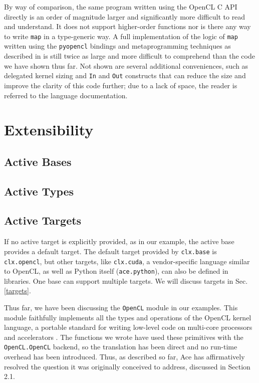 \documentclass[9pt,preprint]{sigplanconf}
\begin{document}
By way of comparison, the same program written using the OpenCL C API directly is an order of magnitude larger and significantly more difficult to read and understand. It does not support higher-order functions nor is there any way to write \verb|map| in a type-generic way. A full implementation of the logic of \verb|map| written using the \verb|pyopencl| bindings and metaprogramming techniques as described in \cite{klockner2011pycuda} is still twice as large and more difficult to comprehend than the code we have shown thus far. Not shown are several additional conveniences, such as delegated kernel sizing and \verb|In| and \verb|Out| constructs that can reduce the size and improve the clarity of this code further; due to a lack of space, the reader is referred to the language documentation.


\section{Extensibility}\label{att}
\subsection{Active Bases}\label{abases}
\subsection{Active Types}\label{atypes}
\subsection{Active Targets}\label{atargets}

If no active target is explicitly provided, as in our example, the active base  provides a default target. The default target provided by \verb|clx.base| is \verb|clx.opencl|, but other targets, like \verb|clx.cuda|, a vendor-specific language similar to OpenCL, as well as Python itself (\verb|ace.python|), can also be defined in libraries. One base can support multiple targets. We will discuss targets in Sec. \ref{targets}.

Thus far, we have been discussing the \verb|OpenCL| module in our examples. This module faithfully implements all the types and operations of the OpenCL kernel language, a portable standard for writing low-level code on multi-core processors and accelerators \cite{opencl11}. The functions we wrote have used these primitives with the \verb|OpenCL.OpenCL| backend, so the translation has been direct and no run-time overhead has been introduced. Thus, as described so far, Ace has affirmatively resolved the question it was originally conceived to address, discussed in Section 2.1. 
\end{document}
